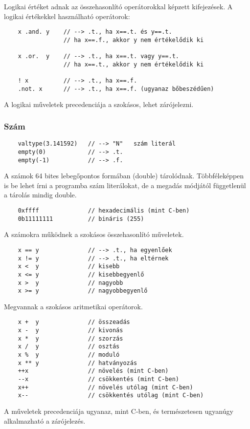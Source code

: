 Logikai értéket adnak az összehasonlító operátorokkal képzett kifejezések.
A logikai értékekkel használható operátorok:
\begin{verbatim}
    x .and. y    // --> .t., ha x==.t. és y==.t.
                 // ha x==.f., akkor y nem értékelődik ki

    x .or.  y    // --> .t., ha x==.t. vagy y==.t.
                 // ha x==.t., akkor y nem értékelődik ki
                 
    ! x          // --> .t., ha x==.f.
    .not. x      // --> .t., ha x==.f. (ugyanaz bőbeszédűen)
\end{verbatim}

A logikai műveletek precedenciája a szokásos, lehet zárójelezni.


\subsubsection{Szám}

\begin{verbatim}
    valtype(3.141592)   // --> "N"   szám literál
    empty(0)            // --> .t.
    empty(-1)           // --> .f.
\end{verbatim}

A számok 64 bites lebegőpontos formában (double) tárolódnak. 
Többféleképpen is be lehet írni a programba szám literálokat, 
de a megadás módjától függetlenül a tárolás mindig double.

\begin{verbatim}
    0xffff              // hexadecimális (mint C-ben)
    0b11111111          // bináris (255)
\end{verbatim}

A számokra működnek a szokásos összehasonlító műveletek.
\begin{verbatim}
    x == y              // --> .t., ha egyenlőek
    x != y              // --> .t., ha eltérnek
    x <  y              // kisebb
    x <= y              // kisebbegyenlő
    x >  y              // nagyobb
    x >= y              // nagyobbegyenlő
\end{verbatim}

Megvannak a szokásos aritmetikai operátorok.
\begin{verbatim}
    x +  y              // összeadás
    x -  y              // kivonás
    x *  y              // szorzás
    x /  y              // osztás
    x %  y              // moduló
    x ** y              // hatványozás
    ++x                 // növelés (mint C-ben)
    --x                 // csökkentés (mint C-ben)
    x++                 // növelés utólag (mint C-ben)
    x--                 // csökkentés utólag (mint C-ben)
\end{verbatim}
A műveletek precedenciája ugyanaz, mint C-ben, és természetesen ugyanúgy
alkalmazható a zárójelezés.

